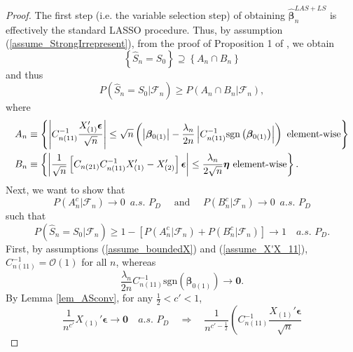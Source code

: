 \documentclass[ejs,authoryear,linksfromyear]{imsart}
\numberwithin{equation}{section}
\theoremstyle{plain}
\begin{document}
\begin{proof}
	The first step (i.e. the variable selection step) of obtaining $\widehat{\bm{\beta}}_n^{LAS+LS}$ is effectively the standard LASSO procedure. Thus, by assumption (\ref{assume_StrongIrrepresent}), from the proof of Proposition 1 of \citet{BinYu}, we obtain
	$$
	\left\{
	    \widehat{S}_n = S_0	
	\right\}
	\supseteq
	\left\{
	    A_n \cap B_n
	\right\}
	$$
	and thus
	$$
	P \left(
		\widehat{S}_n = S_0	
		\Big| \mathcal{F}_n 
	\right)	
	\geq 
	P \left(
		A_n \cap B_n
		\big| \mathcal{F}_n 
	\right), 	%
	$$ 
	where
	\begin{align*}
	A_n &\equiv  
	\left\{
		\left\vert 
			C_{n(11)}^{-1}
			\dfrac{X_{(1)}' \bm{\epsilon}}{\sqrt{n}} 
		\right\vert
		\leq  \sqrt{n}
		\left(
			\left\vert  \bm{\beta}_{0(1)} \right\vert
			- \dfrac{\lambda_n}{2n}
			\left\vert
				C_{n(11)}^{-1}
				\text{sgn} \left( \bm{\beta}_{0(1)} \right)
			\right\vert
		\right)
		\,\, \text{{\rm element-wise}}
	\right\} \\
	B_n &\equiv 
	\left\{
		\left\vert 
			\dfrac{1}{\sqrt{n}} 
			\left[
				C_{n(21)} C_{n(11)}^{-1} X_{(1)}' - X_{(2)}'
			\right]
			\bm{\epsilon}
		\right\vert
		\leq  \dfrac{\lambda_n}{2 \sqrt{n}} \bm{\eta} 
		\,\, \text{{\rm element-wise}}
	\right\}.
	\end{align*}
	Next, we want to show that
	$$
	P \left(
		A_n^c \big| \mathcal{F}_n
	\right)
	\to 0 \,\,\, a.s. \,\, P_D
	\quad \text{ and } \quad
	P \left(
		B_n^c \big| \mathcal{F}_n
	\right)
	\to 0 \,\,\, a.s. \,\, P_D
	$$
	such that
	$$
	P \left(
	\widehat{S}_n = S_0
	\Big| \mathcal{F}_n 
	\right)	
	\geq 1 - 
	\left[
		P \left(
		A_n^c \big| \mathcal{F}_n
		\right) 
		+ P \left(
		B_n^c \big| \mathcal{F}_n
		\right)
	\right]
	\to 1 \quad a.s. \,\, P_D.
	$$
	First, by assumptions (\ref{assume_boundedX}) and (\ref{assume_X'X_11}), $C_{n(11)}^{-1} = \mathcal{O}(1)$ for all $n$, whereas
	$$
	\dfrac{\lambda_n}{2n}
	C_{n(11)}^{-1}
	\text{sgn} \left( \bm{\beta}_{0(1)} \right)
	\to \bm{0}.
	$$
	By Lemma \ref{lem_ASconv}, for any $\frac{1}{2} < c' < 1$,
	$$
	\dfrac{1}{n^{c'}} X_{(1)}' \bm{\epsilon} 
	\to \bm{0} \quad a.s. \,\, P_D
	\quad \Longrightarrow \quad
	\dfrac{1}{n^{c' - \frac{1}{2} }}
	\left(
		C_{n(11)}^{-1}
		\dfrac{X_{(1)}' \bm{\epsilon}}{\sqrt{n}} 
$$
\end{proof}
\end{document}
